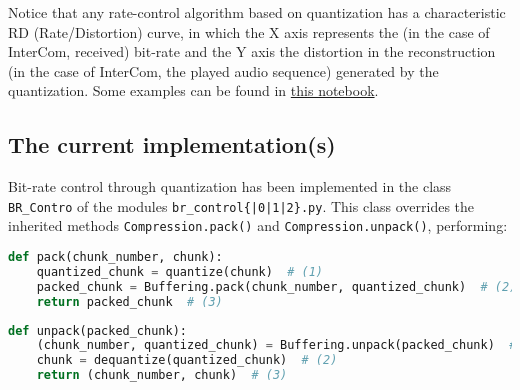 Notice that any rate-control algorithm based on quantization has a
characteristic RD (Rate/Distortion) curve, in which the X axis
represents the (in the case of InterCom, received) bit-rate and the Y
axis the distortion in the reconstruction (in the case of InterCom,
the played audio sequence) generated by the quantization. Some
examples can be found
in \href{https://github.com/Tecnologias-multimedia/Tecnologias-multimedia.github.io/blob/master/study_guide/10-br_control/audio_quantization.ipynb}{this
notebook}.

\subsection{The current implementation(s)}

Bit-rate control through quantization has been implemented in the
class \verb|BR_Contro| of the modules
\texttt{br\_control\{|0|1|2\}.py}. This class overrides the inherited
methods \verb|Compression.pack()| and \verb|Compression.unpack()|,
performing:

\begin{lstlisting}[language=Python]
  def pack(chunk_number, chunk):
    quantized_chunk = quantize(chunk)  # (1)
    packed_chunk = Buffering.pack(chunk_number, quantized_chunk)  # (2)
    return packed_chunk  # (3)
\end{lstlisting}

\begin{lstlisting}[language=Python]
  def unpack(packed_chunk):
    (chunk_number, quantized_chunk) = Buffering.unpack(packed_chunk)  # (1)
    chunk = dequantize(quantized_chunk)  # (2)
    return (chunk_number, chunk)  # (3)
\end{lstlisting}


